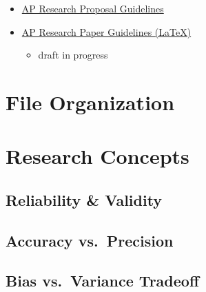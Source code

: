 \documentclass[]{book}
\providecommand{\tightlist}{%
  \setlength{\itemsep}{0pt}\setlength{\parskip}{0pt}}
\begin{document}
\begin{itemize}
\tightlist
\item
  \href{https://www.overleaf.com/read/ncvzdvcvfxdx}{AP Research Proposal Guidelines}
\item
  \href{https://www.overleaf.com/read/hxctjpdnvffw}{AP Research Paper Guidelines (LaTeX)}

  \begin{itemize}
  \tightlist
  \item
    draft in progress
  \end{itemize}
\end{itemize}

\hypertarget{file-organization}{%
\chapter{File Organization}\label{file-organization}}

\hypertarget{research-concepts}{%
\chapter{Research Concepts}\label{research-concepts}}

\hypertarget{reliability-validity}{%
\section{Reliability \& Validity}\label{reliability-validity}}

\hypertarget{accuracy-vs.-precision}{%
\section{Accuracy vs.~Precision}\label{accuracy-vs.-precision}}

\hypertarget{bias-vs.-variance-tradeoff}{%
\section{Bias vs.~Variance Tradeoff}\label{bias-vs.-variance-tradeoff}}
\end{document}
